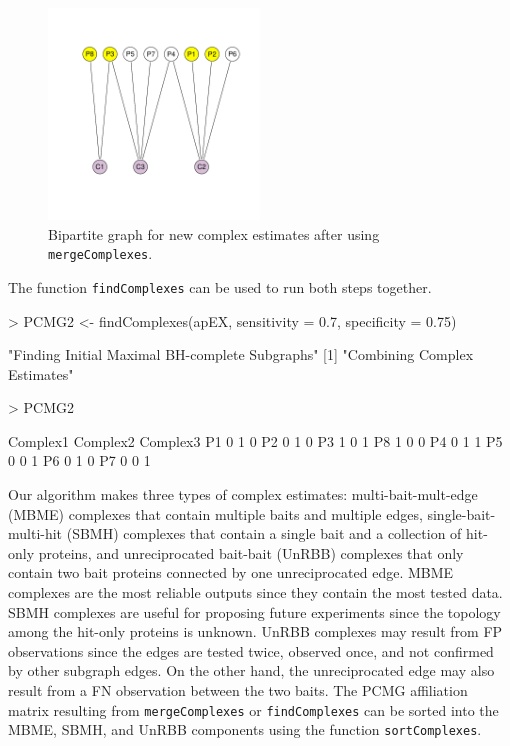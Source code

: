 \documentclass[11pt]{article}
\newcommand{\Rfunction}[1]{{\texttt{#1}}}
\begin{document}
\begin{figure}[htbp]
\begin{center}
\includegraphics[width=0.5\textwidth]{apComplex-BP2}
\caption{\label{fig:BP2}Bipartite graph for new complex estimates after using
\Rfunction{mergeComplexes}.}
\end{center}
\end{figure}

The function \Rfunction{findComplexes} can be used to run both steps together.

\begin{Schunk}
\begin{Sinput}
> PCMG2 <- findComplexes(apEX, sensitivity = 0.7, specificity = 0.75)
\end{Sinput}
\begin{Soutput}
[1] "Finding Initial Maximal BH-complete Subgraphs"
[1] "Combining Complex Estimates"
\end{Soutput}
\begin{Sinput}
> PCMG2
\end{Sinput}
\begin{Soutput}
   Complex1 Complex2 Complex3
P1        0        1        0
P2        0        1        0
P3        1        0        1
P8        1        0        0
P4        0        1        1
P5        0        0        1
P6        0        1        0
P7        0        0        1
\end{Soutput}
\end{Schunk}

Our algorithm makes three types of complex estimates: multi-bait-mult-edge
(MBME) complexes that contain multiple baits and multiple edges,
single-bait-multi-hit (SBMH) complexes that contain a single bait and a
collection of hit-only proteins, and unreciprocated bait-bait (UnRBB)
complexes that only contain two bait proteins connected by one unreciprocated
edge.  MBME complexes are the most reliable outputs since they contain the
most tested data.  SBMH complexes are useful for proposing future experiments
since the topology among the hit-only proteins is unknown.  UnRBB complexes
may result from FP observations since the edges are tested twice, observed once, and
not confirmed by other subgraph edges.  On the other hand, the unreciprocated
edge may also result from a FN observation between the two baits.  The PCMG
affiliation matrix resulting from \Rfunction{mergeComplexes} or
\Rfunction{findComplexes} can be
sorted into the MBME, SBMH, and UnRBB components using the function
\Rfunction{sortComplexes}.
\end{document}
